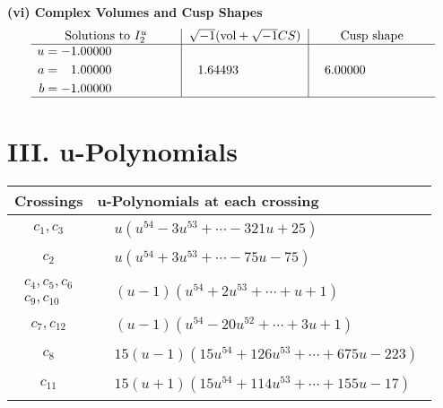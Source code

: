 \documentclass[1p]{elsarticle_modified}
\theoremstyle{definition}
\newcommand{\I}{\sqrt{-1}}
\begin{document}
\newpage\flushleft \textbf{(vi) Complex Volumes and Cusp Shapes}
$$\begin{array}{c|c|c}  
\text{Solutions to }I^u_{2}& \I (\text{vol} + \sqrt{-1}CS) & \text{Cusp shape}\\
 \hline 
\begin{aligned}
u &= -1.00000\phantom{ +0.000000I} \\
a &= \phantom{-}1.00000\phantom{ +0.000000I} \\
b &= -1.00000\phantom{ +0.000000I}\end{aligned}
 & \phantom{-}1.64493\phantom{ +0.000000I} & \phantom{-}6.00000\phantom{ +0.000000I}\\
 \hline 
 \end{array}$$\newpage
\newpage\renewcommand{\arraystretch}{1}
\centering \section*{ III. u-Polynomials}
\begin{tabular}{m{50pt}|m{274pt}}
Crossings & \hspace{64pt}u-Polynomials at each crossing \\
\hline $$\begin{aligned}c_{1},c_{3}\end{aligned}$$&$\begin{aligned}
&u(u^{54}-3 u^{53}+\cdots-321 u+25)
\end{aligned}$\\
\hline $$\begin{aligned}c_{2}\end{aligned}$$&$\begin{aligned}
&u(u^{54}+3 u^{53}+\cdots-75 u-75)
\end{aligned}$\\
\hline $$\begin{aligned}c_{4},c_{5},c_{6}\\c_{9},c_{10}\end{aligned}$$&$\begin{aligned}
&(u-1)(u^{54}+2 u^{53}+\cdots+u+1)
\end{aligned}$\\
\hline $$\begin{aligned}c_{7},c_{12}\end{aligned}$$&$\begin{aligned}
&(u-1)(u^{54}-20 u^{52}+\cdots+3 u+1)
\end{aligned}$\\
\hline $$\begin{aligned}c_{8}\end{aligned}$$&$\begin{aligned}
&15(u-1)(15 u^{54}+126 u^{53}+\cdots+675 u-223)
\end{aligned}$\\
\hline $$\begin{aligned}c_{11}\end{aligned}$$&$\begin{aligned}
&15(u+1)(15 u^{54}+114 u^{53}+\cdots+155 u-17)
\end{aligned}$\\
\hline
\end{tabular}\newpage\renewcommand{\arraystretch}{1}
\end{document}

